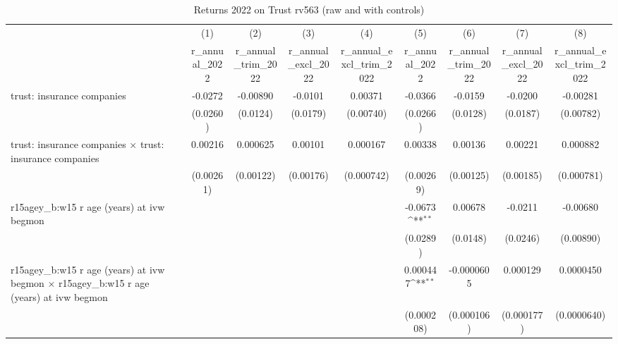 \begin{table}[htbp]\centering
\def\sym#1{\ifmmode^{#1}\else\(^{#1}\)\fi}
\caption{Returns 2022 on Trust rv563 (raw and with controls)}
\begin{tabular}{l*{8}{c}}
\toprule
                &\multicolumn{1}{c}{(1)}&\multicolumn{1}{c}{(2)}&\multicolumn{1}{c}{(3)}&\multicolumn{1}{c}{(4)}&\multicolumn{1}{c}{(5)}&\multicolumn{1}{c}{(6)}&\multicolumn{1}{c}{(7)}&\multicolumn{1}{c}{(8)}\\
                &\multicolumn{1}{c}{r\_annual\_2022}&\multicolumn{1}{c}{r\_annual\_trim\_2022}&\multicolumn{1}{c}{r\_annual\_excl\_2022}&\multicolumn{1}{c}{r\_annual\_excl\_trim\_2022}&\multicolumn{1}{c}{r\_annual\_2022}&\multicolumn{1}{c}{r\_annual\_trim\_2022}&\multicolumn{1}{c}{r\_annual\_excl\_2022}&\multicolumn{1}{c}{r\_annual\_excl\_trim\_2022}\\
\midrule
trust: insurance companies&  -0.0272         & -0.00890         &  -0.0101         &  0.00371         &  -0.0366         &  -0.0159         &  -0.0200         & -0.00281         \\
                & (0.0260)         & (0.0124)         & (0.0179)         &(0.00740)         & (0.0266)         & (0.0128)         & (0.0187)         &(0.00782)         \\
\addlinespace
trust: insurance companies $\times$ trust: insurance companies&  0.00216         & 0.000625         &  0.00101         & 0.000167         &  0.00338         &  0.00136         &  0.00221         & 0.000882         \\
                &(0.00261)         &(0.00122)         &(0.00176)         &(0.000742)         &(0.00269)         &(0.00125)         &(0.00185)         &(0.000781)         \\
\addlinespace
r15agey\_b:w15 r age (years) at ivw begmon&                  &                  &                  &                  &  -0.0673\sym{**} &  0.00678         &  -0.0211         & -0.00680         \\
                &                  &                  &                  &                  & (0.0289)         & (0.0148)         & (0.0246)         &(0.00890)         \\
\addlinespace
r15agey\_b:w15 r age (years) at ivw begmon $\times$ r15agey\_b:w15 r age (years) at ivw begmon&                  &                  &                  &                  & 0.000447\sym{**} &-0.0000605         & 0.000129         &0.0000450         \\
                &                  &                  &                  &                  &(0.000208)         &(0.000106)         &(0.000177)         &(0.0000640)         \\

\end{tabular}
\end{table}
